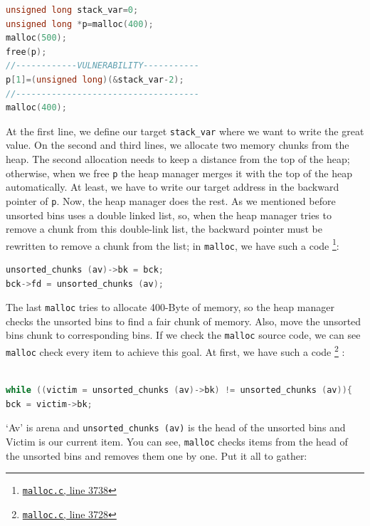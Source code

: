 \documentclass{masterthesis}
\newcommand*\ub{unsorted bins}
\newcommand*\mallocc{\lstinline{malloc}\xspace}
\begin{document}
\begin{lstlisting}[language=c,frame=tlrb]
unsigned long stack_var=0;
unsigned long *p=malloc(400);
malloc(500);
free(p);
//------------VULNERABILITY-----------
p[1]=(unsigned long)(&stack_var-2);
//------------------------------------
malloc(400);
\end{lstlisting}
 At the first line, we define our target \lstinline{stack_var} where we want to write the great value. On the second and third lines, we allocate two memory chunks from the heap. The second allocation needs to keep a distance from the top of the heap; otherwise, when we free \lstinline{p} the heap manager merges it with the top of the heap automatically. At least, we have to write our target address in the backward pointer of \lstinline{p}. Now, the heap manager does the rest. As we mentioned before \ub{} uses a double linked list, so, when the heap manager tries to remove a chunk from this double-link list, the backward pointer must be rewritten to remove a chunk from the list; in \mallocc{}, we have such a code \footnote{\href{https://sourceware.org/git/?p=glibc.git;a=blob;f=malloc/malloc.c;h=f7cd29bc2f93e1082ee77800bd64a4b2a2897055;hb=9ea3686266dca3f004ba874745a4087a89682617\#l3738}{\texttt{malloc.c}, line 3738}}:

\begin{lstlisting}[language=c,frame=tlrb]
unsorted_chunks (av)->bk = bck;
bck->fd = unsorted_chunks (av);
\end{lstlisting}

The last \mallocc{} tries to allocate 400-Byte of memory, so the heap manager checks the \ub{} to find a fair chunk of memory. Also, move the \ub{} chunk to corresponding bins. If we check the \mallocc{} source code, we can see \mallocc{} check every item to achieve this goal. At first, we have such a code \footnote{\href{https://sourceware.org/git/?p=glibc.git;a=blob;f=malloc/malloc.c;h=f7cd29bc2f93e1082ee77800bd64a4b2a2897055;hb=9ea3686266dca3f004ba874745a4087a89682617\#l3728}{\texttt{malloc.c}, line 3728}} :
\begin{lstlisting}[language=c,frame=tlrb]

while ((victim = unsorted_chunks (av)->bk) != unsorted_chunks (av)){
bck = victim->bk;
\end{lstlisting}
‘Av’ is arena and \lstinline{unsorted_chunks (av)} is the head of the \ub{} and Victim is our current item. You can see, \mallocc{} checks items from the head of the \ub{} and removes them one by one. Put it all to gather:
\end{document}
